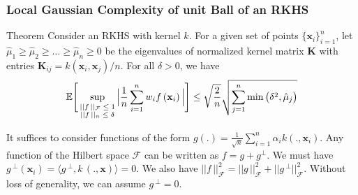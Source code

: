 \documentclass[11pt]{beamer}
\newcommand{\E}{\mathbb{E}}
\newcommand{\bx}{\mathbf{x}}
\newcommand{\cF}{\mathcal{F}}
\begin{document}
\begin{frame}
	\frametitle{Local Gaussian Complexity of unit Ball of an RKHS}
	\begin{block}{Theorem}
		Consider an RKHS with kernel $k$. For a given set of points $\{\bx_i\}_{i = 1}^{n}$, let $\hat{\mu}_1 \geq \hat{\mu}_2 \geq \dots \geq \hat{\mu}_n \geq 0$ be the eigenvalues of normalized kernel matrix $\mathbf{K}$ with entries $\mathbf{K}_{ij} = k(\bx_i, \bx_j)/n$. For all $\delta >0$, we have
		\begin{equation*}
			\E\Bigg[\sup_{
		\begin{scriptsize}
		\begin{matrix}
		||f\,||_\cF \leq 1\\
		||f\,||_n\leq \delta
		\end{matrix}
		\end{scriptsize}}
	\Big|\frac{1}{n} \sum_{i = 1}^{n} w_i f\,(\bx_i)\,\Big|\Bigg] \leq \sqrt{\frac{2}{n}}\sqrt{\sum_{j = 1}^{n} \min\big(\delta^2, \hat\mu_j\big)}
		\end{equation*}
	\end{block}
		It suffices to consider functions of the form $g(.) = \frac{1}{\sqrt{n}} \sum_{i = 1}^{n} \alpha_i k(., \bx_i)$. Any function of the Hilbert space $\cF$ can be written as $f = g + g^\perp$. We must have $g\,^\perp(\bx_i) = \langle g\,^\perp, k\,(., \bx)\rangle = 0$. We also have $||f\,||_\cF^2 = ||g\,||_\cF^2 + ||g\,^\perp||_\cF^2$. Without loss of generality, we can assume $g\,^\perp = 0$.	
\end{frame}
\end{document}

